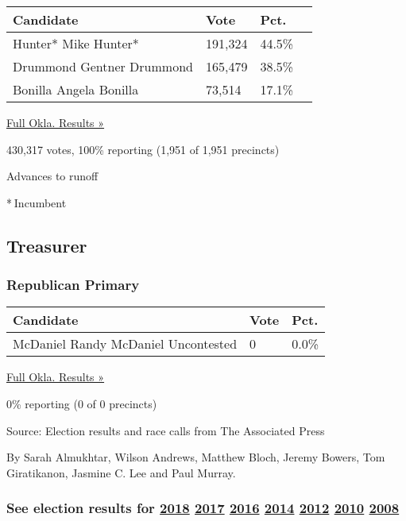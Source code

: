 \begin{longtable}[]{@{}llll@{}}
\toprule
Candidate & Vote & Pct. &\tabularnewline
\midrule
\endhead
 Hunter* Mike Hunter* & 191,324 & 44.5\% &\tabularnewline
 Drummond Gentner Drummond & 165,479 & 38.5\% &\tabularnewline
 Bonilla Angela Bonilla & 73,514 & 17.1\% &\tabularnewline
\bottomrule
\end{longtable}

\href{https://www.nytimes3xbfgragh.onion/elections/results/oklahoma}{Full
Okla. Results »}

430,317 votes, 100\% reporting (1,951 of 1,951 precincts)

 Advances to runoff

* Incumbent

\hypertarget{treasurer}{%
\subsection{Treasurer}\label{treasurer}}

\hypertarget{republican-primary-8}{%
\subsubsection{Republican Primary}\label{republican-primary-8}}

\begin{longtable}[]{@{}lll@{}}
\toprule
Candidate & Vote & Pct.\tabularnewline
\midrule
\endhead
 McDaniel Randy McDaniel Uncontested & 0 & 0.0\%\tabularnewline
\bottomrule
\end{longtable}

\href{https://www.nytimes3xbfgragh.onion/elections/results/oklahoma}{Full
Okla. Results »}

0\% reporting (0 of 0 precincts)

Source: Election results and race calls from The Associated Press

By Sarah Almukhtar, Wilson Andrews, Matthew Bloch, Jeremy Bowers, Tom
Giratikanon, Jasmine C. Lee and Paul Murray.

\hypertarget{see-election-results-for-2018-2017-2016-2014-2012-2010-2008}{%
\subsubsection{\texorpdfstring{See election results for
\href{https://www.nytimes3xbfgragh.onion/interactive/2018/us/elections/calendar-primary-results.html}{2018}
\href{https://www.nytimes3xbfgragh.onion/interactive/2017/us/elections/election-calendar.html}{2017}
\href{https://www.nytimes3xbfgragh.onion/elections/results/president}{2016}
\href{https://www.nytimes3xbfgragh.onion/elections/2014/results/senate}{2014}
\href{https://www.nytimes3xbfgragh.onion/elections/2012/results/president.html}{2012}
\href{https://www.nytimes3xbfgragh.onion/elections/2010/results/senate.html}{2010}
\href{https://www.nytimes3xbfgragh.onion/elections/2008/results/president/map.html}{2008}}{See election results for 2018 2017 2016 2014 2012 2010 2008}}\label{see-election-results-for-2018-2017-2016-2014-2012-2010-2008}}

